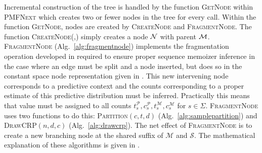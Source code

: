 Incremental construction of the tree is handled by the function \textsc{GetNode} within \textsc{PMFNext} which creates two or fewer nodes in the tree for every call.  Within the function \textsc{GetNode}, nodes are created by \textsc{CreateNode} and \textsc{FragmentNode}. The function \textsc{CreateNode(\N,\M)} simply creates a node $\N$ with parent $\M$. \textsc{FragmentNode} (Alg.~\ref{alg:fragmentnode}) implements the fragmentation operation developed in \citep{Wood2009} required to ensure proper sequence memoizer inference in the case where an edge must be split and a node inserted, but does so in the constant space node representation given in \citep{Gasthaus2011}.  This new intervening node corresponds to a predictive context and the counts corresponding to a proper estimate of this predictive distribution must be inferred.   Practically this means that value must be assigned to all counts $t_s^\mathcal{P}, c_s^\mathcal{P}, t_s^\mathcal{M}, c_s^\mathcal{M}$ for $s\in\Sigma$.  \textsc{FragmentNode} uses two functions to do this: \textsc{Partition}$(c,t,d)$ (Alg.~\ref{alg:samplepartition}) and \textsc{DrawCRP}$(n,d,c)$ (Alg.~\ref{alg:drawcrp}).  The net effect of \textsc{FragmentNode} is to create a new branching node at the shared suffix of $\mathcal{M}$ and $\mathcal{S}.$   The mathematical explanation of these algorithms is given in \citep{Gasthaus2011}.  %

